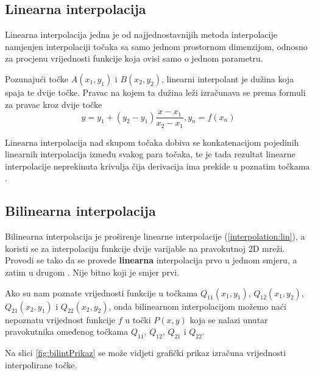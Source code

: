 
\subsection{Linearna interpolacija}
\label{subsec:linInt}
\label{interpolation:lin}

Linearna interpolacija jedna je od najjednostavnijih metoda interpolacije namjenjen interpolaciji točaka sa samo jednom prostornom dimenzijom, odnosno za procjenu vrijednosti funkcije koja ovisi samo o jednom parametru. 

Pozunajući točke $A (x_1, y_1)$ i $B (x_2, y_2)$, linearni interpolant je dužina koja spaja te dvije točke. Pravac na kojem ta dužina leži izračunava se prema formuli za pravac kroz dvije točke \citep{_linear_2013}
\begin{equation}
	y = y_1 + (y_2 - y_1) \frac{x - x_1}{x_2 - x_1}, y_n = f(x_n)
\end{equation}

Linearna interpolacija nad skupom točaka dobiva se konkatenacijom pojedinih linearnih interpolacija između svakog para točaka, te je tada rezultat linearne interpolacije neprekinuta krivulja čija derivacija ima prekide u poznatim točkama \citep{Bosilj2010} \citep{_linear_2013}.

\subsection{Bilinearna interpolacija}
\label{subsec:bilinInt}

Bilinearna interpolacija je proširenje linearne interpolacije (\ref{interpolation:lin}), a koristi se za interpolaciju funkcije dvije varijable na pravokutnoj 2D mreži. Provodi se tako da se provede \textbf{linearna} interpolacija prvo u jednom smjeru, a zatim u drugom \citep {_bilinear_2013}. Nije bitno koji je smjer prvi.

Ako su nam poznate vrijednosti funkcije u točkama $Q_{11} (x_1, y_1)$, $Q_{12} (x_1, y_2)$, $Q_{21}  (x_2, y_1)$ i $Q_{22} (x_2, y_2)$, onda bilinearnom interpolacijom možemo naći nepoznatu vrijednost funkcije $f$ u točki $P (x, y)$ koja se nalazi unutar pravokutnika omeđenog točkama $Q_{11}$, $Q_{12}$, $Q_{21}$ i $Q_{22}$.

Na slici \eqref{fig:bilintPrikaz} se može vidjeti grafički prikaz izračuna vrijednosti interpolirane točke.

